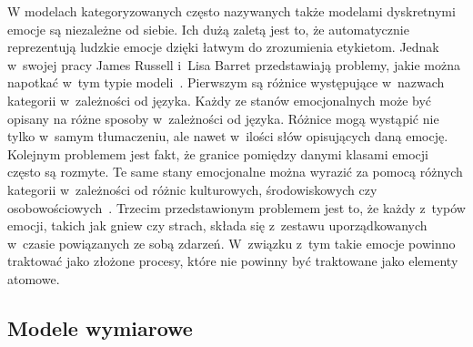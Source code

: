 W modelach kategoryzowanych często nazywanych także modelami dyskretnymi emocje są niezależne od siebie. Ich dużą zaletą jest to, że automatycznie reprezentują ludzkie emocje dzięki łatwym do zrozumienia etykietom. Jednak w~swojej pracy James Russell i~Lisa Barret przedstawiają problemy, jakie można napotkać w~tym typie modeli~\cite{russel_barret_core_affect}. Pierwszym są różnice występujące w~nazwach kategorii w~zależności od języka. Każdy ze stanów emocjonalnych może być opisany na różne sposoby w~zależności od języka. Różnice mogą wystąpić nie tylko w~samym tłumaczeniu, ale nawet w~ilości słów opisujących daną emocję. Kolejnym problemem jest fakt, że granice pomiędzy danymi klasami emocji często są rozmyte. Te same stany emocjonalne można wyrazić za pomocą różnych kategorii w~zależności od różnic kulturowych, środowiskowych czy osobowościowych~\cite{emotion_models_review_2017}. Trzecim przedstawionym problemem jest to, że każdy z~typów emocji, takich jak gniew czy strach, składa się z~zestawu uporządkowanych w~czasie powiązanych ze sobą zdarzeń. W~związku z~tym takie emocje powinno traktować jako złożone procesy, które nie powinny być traktowane jako elementy atomowe.

\subsection{Modele wymiarowe}

